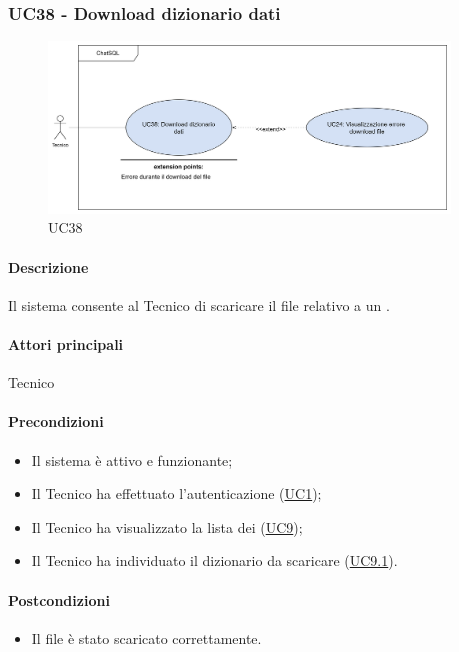 \subsubsection{UC38 - Download dizionario dati}\label{UC38}

\begin{figure}[H]
  \centering
  \includegraphics[width=0.95\textwidth]{assets/uc38.png}
  \caption{UC38}
\end{figure}

\paragraph*{Descrizione}
Il sistema consente al Tecnico di scaricare il file relativo a un .

\paragraph*{Attori principali}
Tecnico

\paragraph*{Precondizioni}
\begin{itemize}
  \item Il sistema è attivo e funzionante;
  \item Il Tecnico ha effettuato l'autenticazione (\hyperref[UC1]{UC1});
  \item Il Tecnico ha visualizzato la lista dei  (\hyperref[UC9]{UC9});
  \item Il Tecnico ha individuato il dizionario da scaricare (\hyperref[UC9.1]{UC9.1}).
\end{itemize}

\paragraph*{Postcondizioni}
\begin{itemize}
  \item Il file è stato scaricato correttamente.
\end{itemize}

